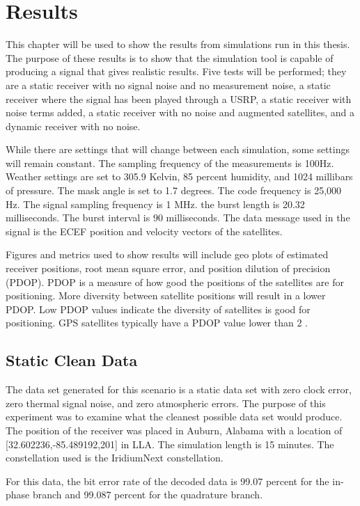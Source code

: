 \documentclass[12pt]{report}
\begin{document}
\chapter{Results}

This chapter will be used to show the results from simulations run in this thesis. The purpose of these results is to show that the simulation tool is capable of producing a signal that gives realistic results. Five tests will be performed; they are a static receiver with no signal noise and no measurement noise, a static receiver where the signal has been played through a USRP, a static receiver with noise terms added, a static receiver with no noise and augmented satellites, and a dynamic receiver with no noise. 

While there are settings that will change between each simulation, some settings will remain constant. The sampling frequency of the measurements is 100Hz. Weather settings are set to 305.9 Kelvin, 85 percent humidity, and 1024 millibars of pressure. The mask angle is set to 1.7 degrees. The code frequency is 25,000 Hz. The signal sampling frequency is 1 MHz. the burst length is 20.32 milliseconds. The burst interval is 90 milliseconds. The data message used in the signal is the ECEF position and velocity vectors of the satellites.

Figures and metrics used to show results will include geo plots of estimated receiver positions, root mean square error, and position dilution of precision (PDOP). PDOP is a measure of how good the positions of the satellites are for positioning. More diversity between satellite positions will result in a lower PDOP. Low PDOP values indicate the diversity of satellites is good for positioning. GPS satellites typically have a PDOP value lower than 2 \cite{misraGlobalPositioningSystem2012}. 

\section{Static Clean Data}
The data set generated for this scenario is a static data set with zero clock error, zero thermal signal noise, and zero atmospheric errors. The purpose of this experiment was to examine what the cleanest possible data set would produce. The position of the receiver was placed in Auburn, Alabama with a location of [32.602236,-85.489192,201] in LLA. The simulation length is 15 minutes. The constellation used is the IridiumNext constellation. 

For this data, the bit error rate of the decoded data is 99.07 percent for the in-phase branch and 99.087 percent for the quadrature branch. 
\end{document}
